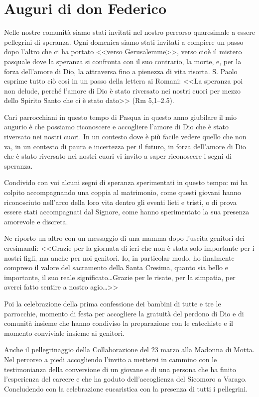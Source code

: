 \section{Auguri di don Federico}

Nelle nostre comunità siamo stati invitati nel nostro percorso quaresimale a essere pellegrini di speranza. Ogni domenica siamo stati invitati a compiere un passo dopo l'altro che ci ha portato <<verso Gerusalemme>>, verso cioè il mistero pasquale dove la speranza si confronta con il suo contrario, la morte, e, per la forza dell'amore di Dio, la attraversa fino a pienezza di vita risorta. S. Paolo esprime tutto ciò così in un passo della lettera ai Romani: <<La speranza poi non delude, perché l'amore di Dio è stato riversato nei nostri cuori per mezzo dello Spirito Santo che ci è stato dato>> (Rm 5,1--2.5).

Cari parrocchiani in questo tempo di Pasqua in questo anno giubilare il mio augurio è che possiamo riconoscere e accogliere l'amore di Dio che è stato riversato nei nostri cuori. In un contesto dove è più facile vedere quello che non va, in un contesto di paura e incertezza per il futuro, in forza dell'amore di Dio che è stato riversato nei nostri cuori vi invito a saper riconoscere i segni di speranza.

Condivido con voi alcuni segni di speranza sperimentati in questo tempo: mi ha colpito accompagnando una coppia al matrimonio, come questi giovani hanno riconosciuto nell'arco della loro vita dentro gli eventi lieti e tristi, o di prova essere stati accompagnati dal Signore, come hanno sperimentato la sua presenza amorevole e discreta.

Ne riporto un altro con un messaggio di una mamma dopo l'uscita genitori dei cresimandi: <<Grazie per la giornata di ieri che non è stata solo importante per i nostri figli, ma anche per noi genitori. Io, in particolar modo, ho finalmente compreso il valore del sacramento della Santa Cresima, quanto sia bello e importante, il suo reale significato\ldots Grazie per le risate, per la simpatia, per averci fatto sentire a nostro agio\ldots>>

Poi la celebrazione della prima confessione dei bambini di tutte e tre le parrocchie, momento di festa per accogliere la gratuità del perdono di Dio e di comunità insieme che hanno condiviso la preparazione con le catechiste e il momento conviviale insieme ai genitori.

Anche il pellegrinaggio della Collaborazione del 23 marzo alla Madonna di Motta. Nel percorso a piedi accogliendo l'invito a mettersi in cammino con le testimonianza della conversione di un giovane e di una persona che ha finito l'esperienza del carcere e che ha goduto dell'accoglienza del Sicomoro a Varago. Concludendo con la celebrazione eucaristica con la presenza di tutti i pellegrini.

